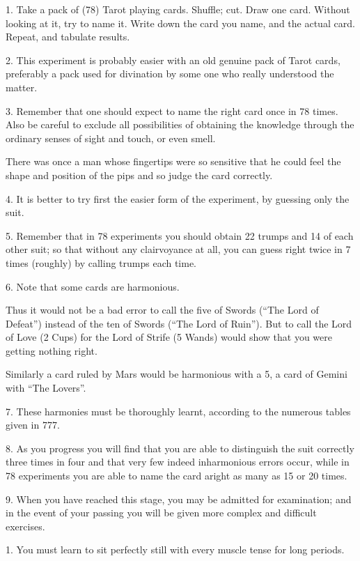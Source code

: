 1. Take a pack of (78) Tarot playing cards. Shuffle; cut. Draw one card. Without looking at it, try to name it. Write down the card you name, and the actual card. Repeat, and tabulate results.

2. This experiment is probably easier with an old genuine pack of Tarot cards, preferably a pack used for divination by some one who really understood the matter.

3. Remember that one should expect to name the right card once in 78 times. Also be careful to exclude all possibilities of obtaining the knowledge through the ordinary senses of sight and touch, or even smell.

There was once a man whose fingertips were so sensitive that he could feel the shape and position of the pips and so judge the card correctly.

4. It is better to try first the easier form of the experiment, by guessing only the suit.

5. Remember that in 78 experiments you should obtain 22 trumps and 14 of each other suit; so that without any clairvoyance at all, you can guess right twice in 7 times (roughly) by calling trumps each time.

6. Note that some cards are harmonious.

Thus it would not be a bad error to call the five of Swords (\enquote{The Lord of Defeat}) instead of the ten of Swords (\enquote{The Lord of Ruin}). But to call the Lord of Love (2 Cups) for the Lord of Strife (5 Wands) would show that you were getting nothing right.

Similarly a card ruled by Mars would be harmonious with a 5, a card of Gemini with \enquote{The Lovers}.

7. These harmonies must be thoroughly learnt, according to the numerous tables given in 777.

8. As you progress you will find that you are able to distinguish the suit correctly three times in four and that very few indeed inharmonious errors occur, while in 78 experiments you are able to name the card aright as many as 15 or 20 times.

9. When you have reached this stage, you may be admitted for examination; and in the event of your passing you will be given more complex and difficult exercises.



1. You must learn to sit perfectly still with every muscle tense for long periods.

